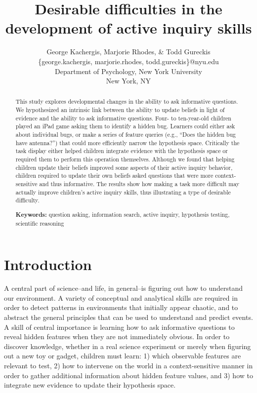 \documentclass[man,floatsintext]{apa6}
\title{Desirable difficulties in the development of active inquiry skills}
\author{
 George Kachergis, Marjorie Rhodes, \& Todd Gureckis \\
  \{george.kachergis, marjorie.rhodes, todd.gureckis\}@nyu.edu \\
  Department of Psychology, New York University \\
  New York, NY
}
\begin{document}
\maketitle

\begin{abstract}
This study explores developmental changes in the ability to ask 
informative questions.  We hypothesized an intrinsic link between the ability to 
update beliefs in light of evidence and the ability to ask informative questions. 
Four- to ten-year-old children 
played an iPad game asking them to identify a hidden bug. Learners could either 
ask about individual bugs, or make a series of feature queries (e.g., ``Does the 
hidden bug have antenna?'') that could more efficiently narrow the hypothesis 
space. Critically the task display either helped children integrate evidence 
with the hypothesis space or required them to perform this operation themselves.  Although we 
found that helping children update their beliefs improved some aspects of their active 
inquiry behavior, children required to update their own beliefs asked questions that 
were more context-sensitive and thus informative.  The results show how making a 
task more difficult may actually improve children's active inquiry skills, thus 
illustrating a type of desirable difficulty.

\textbf{Keywords:} 
question asking, information search, active inquiry, hypothesis testing, scientific 
reasoning
\end{abstract}


\section{Introduction} 


A central part of science--and life, in general--is figuring out how to understand our environment. 
A variety of conceptual and analytical skills are required in order to detect patterns in 
environments that initially appear chaotic, and to abstract the general principles that can 
be used to understand and predict events. A skill of central importance is learning how to ask 
informative questions to reveal hidden features when they are not immediately obvious.
In order to discover knowledge, whether in a real science experiment or 
merely when figuring out a new toy or gadget, children must learn: 1) which 
observable features are relevant to test, 2) how to intervene on the world in a 
context-sensitive manner in order to gather additional information about hidden 
feature values, and 3) how to integrate new evidence to update their hypothesis space.
\end{document}

